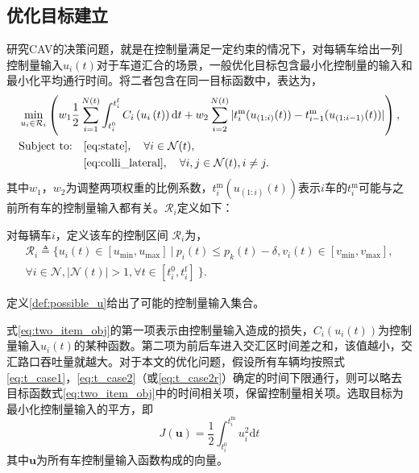 \subsection{优化目标建立}
研究CAV的决策问题，就是在控制量满足一定约束的情况下，对每辆车给出一列控制量输入$u_i(t)$对于车道汇合的场景，一般优化目标包含最小化控制量的输入和最小化平均通行时间。\cite{Rios2016Automated}将二者包含在同一目标函数中，表达为，
\begin{equation}
\begin{aligned}
&\min_{u_i\in \mathcal{R}_i}\left(w_1\frac12\sum^{N(t)}_{i=1}\int_{t_i^0}^{t_i^\mathrm{f}}C_i\left(u_i\left(t\right)\right)\mathrm{d}t + w_2\sum_{i=2}^{N(t)}|t_i^\mathrm{m}(u_{(1:i)}(t))-t_{i-1}^\mathrm{m}(u_{(1:i-1)}(t))|\right),\\
&
\begin{aligned}
\text{Subject to:} & \quad \mbox{\ref{eq:state}}, \quad \forall i\in \mathcal{N}(t),\\
& \quad \mbox{\ref{eq:colli_lateral}}, \quad \forall i,j \in \mathcal{N}(t), i\neq j.
\end{aligned}
\end{aligned}
\label{eq:two_item_obj}
\end{equation}
其中$w_1$，$w_2$为调整两项权重的比例系数，$t_i^\mathrm{m}(u_{(1:i)}(t))$表示$i$车的$t_i^\mathrm{m}$可能与之前所有车的控制量输入都有关。$\mathcal{R}_i$定义如下：
\begin{definition}[控制区间]
对每辆车$i$，定义该车的{\heiti 控制区间} $\mathcal{R}_i$为，
\begin{equation}
\begin{gathered}
\mathcal{R}_i\triangleq\{u_i(t)\in[u_{\min}, u_{\max}]\ |\ p_i(t)\leq p_k(t)-\delta, v_i(t)\in[v_{\min}, v_{\max}],\\
\forall i \in \mathcal{N}, |\mathcal{N}(t)|>1, \forall t \in [t_i^0, t_i^\mathrm{f}]\ \}.
\end{gathered}
\end{equation}
\label{def:possible_u}
\end{definition}
定义\ref{def:possible_u}给出了可能的控制量输入集合。

式\ref{eq:two_item_obj}的第一项表示由控制量输入造成的损失，$C_i(u_i(t))$为控制量输入$u_i(t)$的某种函数。第二项为前后车进入交汇区时间差之和，该值越小，交汇路口吞吐量就越大。对于本文的优化问题，假设所有车辆均按照式\ref{eq:t_case1}，\ref{eq:t_case2}（或\ref{eq:t_case2r}）确定的时间下限通行，则可以略去目标函数式\ref{eq:two_item_obj}中的时间相关项，保留控制量相关项。选取目标为最小化控制量输入的平方\cite{Malikopoulos2016A,Rios2016Automated}，即
\begin{equation}
J(\bm{u})=\frac12\int_{t_i^0}^{t_i^\mathrm{m}}u_i^2\mathrm{d}t
\label{eq:one_item_obj}
\end{equation}
其中$\bm{u}$为所有车控制量输入函数构成的向量。